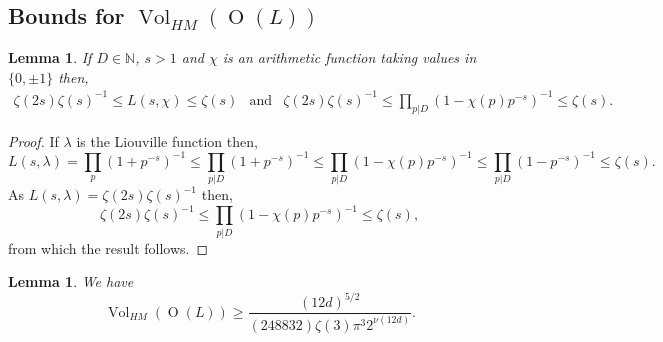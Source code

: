 \documentclass[12pt, a4paper]{article}
\newtheorem{lemma}[thm]{Lemma}
\newcommand{\NN}{\mathbb{N}}
\newcommand{\opn}{\operatorname}
\begin{document}
\subsection{Bounds for $\opn{Vol}_{HM}(\opn{O}(L))$}
\begin{lemma}\label{LfBound}
  If $D \in \NN$, $s>1$ and $\chi$ is an arithmetic function taking values in $\{0, \pm 1\}$ then,   
\[
\begin{array}{ccc}
  \zeta(2s) \zeta(s)^{-1} \leq L(s, \chi) \leq \zeta(s) 
  & \text{and} & 
  \zeta(2s) \zeta(s)^{-1} \leq \prod_{p \vert D} (1 - \chi(p)p^{-s})^{-1} \leq \zeta(s).
\end{array}
\]
\end{lemma}
\begin{proof}
  If $\lambda$ is the Liouville function then, 
  \begin{equation*}
    L(s, \lambda)
    =
    \prod_p (1 + p^{-s})^{-1}
    \leq
    \prod_{p \vert D} (1 + p^{-s})^{-1}
    \leq
    \prod_{p \vert D} (1 - \chi(p)p^{-s})^{-1}
    \leq
    \prod_{p \vert D} (1 - p^{-s})^{-1}
    \leq
    \zeta(s).
  \end{equation*}
  As $L(s, \lambda)=\zeta(2s) \zeta(s)^{-1}$ \cite[p.335]{HardyWright} then, 
  \begin{equation*}
    \zeta(2s) \zeta(s)^{-1}
    \leq
    \prod_{p \vert D} (1 - \chi(p)p^{-s})^{-1}
    \leq
    \zeta(s),
  \end{equation*}
  from which the result follows.
\end{proof}
\begin{lemma}\label{Lbound}
  We have
  \begin{equation*}
    \opn{Vol}_{HM}(\opn{O}(L)) \geq \frac{(12d)^{5/2} }{ (248832) \zeta(3) \pi^3 2^{\nu(12d)}}.
  \end{equation*}
\end{lemma}
\end{document}

